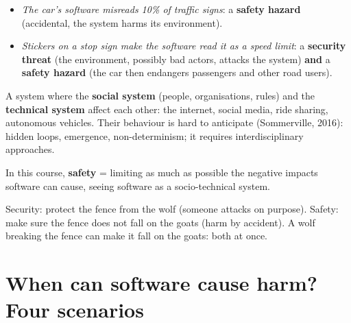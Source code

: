 \documentclass[11pt,a4paper,openany]{book}
\begin{document}
\begin{exbox}[title={Exam-type questions: autonomous car}]
\begin{itemize}
  \item \emph{The car's software misreads 10\% of traffic signs}: a \textbf{safety hazard}
        (accidental, the system harms its environment).
  \item \emph{Stickers on a stop sign make the software read it as a speed limit}: a
        \textbf{security threat} (the environment, possibly bad actors, attacks the system)
        \textbf{and} a \textbf{safety hazard} (the car then endangers passengers and other
        road users).
\end{itemize}
\end{exbox}

\begin{defnbox}[title={Socio-technical system (Oosthuizen \& Pretorius, 2016)}]
A system where the \textbf{social system} (people, organisations, rules) and the
\textbf{technical system} affect each other: the internet, social media, ride sharing,
autonomous vehicles. Their behaviour is hard to anticipate (Sommerville, 2016): hidden loops,
emergence, non-determinism; it requires interdisciplinary approaches.
\end{defnbox}

\begin{keybox}
In this course, \textbf{safety} = limiting as much as possible the negative impacts software can
cause, seeing software as a socio-technical system.
\end{keybox}

\begin{goatbox}
Security: protect the fence from the wolf (someone attacks on purpose). Safety: make sure the
fence does not fall on the goats (harm by accident). A wolf breaking the fence can make it fall
on the goats: both at once.
\end{goatbox}


\section{When can software cause harm? Four scenarios}
\end{document}

